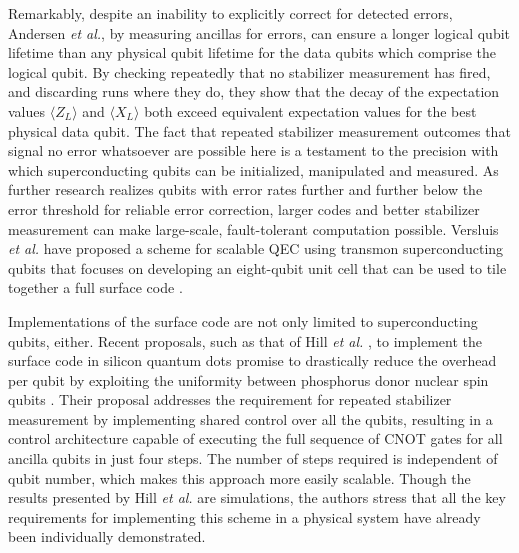Remarkably, despite an inability to explicitly correct for detected errors,
Andersen \textit{et al.}, by measuring ancillas for errors, can ensure a longer
logical qubit lifetime than any physical qubit lifetime for the data qubits
which comprise the logical qubit. By checking repeatedly that no stabilizer
measurement has fired, and discarding runs where they do, they show that the
decay of the expectation values $\langle Z_L \rangle$ and $\langle X_L \rangle$
both exceed equivalent expectation values for the best physical data qubit. The
fact that repeated stabilizer measurement outcomes that signal no error
whatsoever are possible here is a testament to the precision with which
superconducting qubits can be initialized, manipulated and measured. As further
research realizes qubits with error rates further and further below the error
threshold for reliable error correction, larger codes and better stabilizer
measurement can make large-scale, fault-tolerant computation possible. Versluis
\textit{et al.} have proposed a scheme for scalable QEC using transmon
superconducting qubits that focuses on developing an eight-qubit unit cell that
can be used to tile together a full surface code \cite{Versluis_2017}.

Implementations of the surface code are not only limited to superconducting
qubits, either. Recent proposals, such as that of Hill \textit{et al.} , to
implement the surface code in silicon quantum dots promise to drastically reduce
the overhead per qubit by exploiting the uniformity between phosphorus donor
nuclear spin qubits \cite{silicon_surface_code}. Their proposal addresses the
requirement for repeated stabilizer measurement by implementing shared control
over all the qubits, resulting in a control architecture capable of executing
the full sequence of CNOT gates for all ancilla qubits in just four steps. The
number of steps required is independent of qubit number, which makes this
approach more easily scalable. Though the results presented by Hill \textit{et
  al.} are simulations, the authors stress that all the key requirements for
implementing this scheme in a physical system have already been individually
demonstrated.

